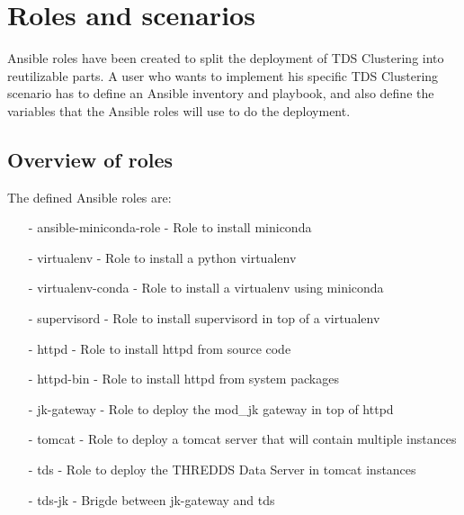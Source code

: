 \documentclass[a4paper,12pt]{article}
\begin{document}
\section{Roles and scenarios}

Ansible roles have been created to split the deployment of TDS Clustering into reutilizable parts. A user who wants to implement his specific TDS Clustering scenario has to define an Ansible inventory and playbook, and also define the variables that the Ansible roles will use to do the deployment.

\subsection{Overview of roles}

The defined Ansible roles are:

\begin{itemize}
\item[-] ansible-miniconda-role - Role to install miniconda
\item[-] virtualenv - Role to install a python virtualenv
\item[-] virtualenv-conda - Role to install a virtualenv using miniconda
\item[-] supervisord - Role to install supervisord in top of a virtualenv
\item[-] httpd - Role to install httpd from source code
\item[-] httpd-bin - Role to install httpd from system packages
\item[-] jk-gateway - Role to deploy the mod\_jk gateway in top of httpd
\item[-] tomcat - Role to deploy a tomcat server that will contain multiple instances
\item[-] tds - Role to deploy the THREDDS Data Server in tomcat instances
\item[-] tds-jk - Brigde between jk-gateway and tds
\end{itemize}
\end{document}
